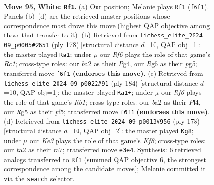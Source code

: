 \documentclass[11pt]{article}
\begin{document}
\clearpage

\begin{figure}[p]\centering
\begin{subfigure}{0.46\textwidth}\centering
\resizebox{\linewidth}{!}{%
\newchessgame
\chessboard[
  setfen={7r/3k4/1P3R2/6R1/8/4K3/b7/8 w - - 9 95},
  showmover=false,
  pgfstyle=straightmove, color=movearrow, markmove={f6-f1}
]}
\caption{}
\end{subfigure}\hfill
\begin{subfigure}{0.46\textwidth}\centering
\resizebox{\linewidth}{!}{%
\newchessgame
\chessboard[
  setfen={8/8/8/3k2p1/6P1/8/1r6/2R1K3 w - - 6 90},
  showmover=false,
  pgfstyle=straightmove, color=movearrow, markmove={c1-a1}
]}
\caption{}
\end{subfigure}
\\[4pt]
\begin{subfigure}{0.46\textwidth}\centering
\resizebox{\linewidth}{!}{%
\newchessgame
\chessboard[
  setfen={8/8/8/k4p2/5P2/8/7r/1R2K3 w - - 54 93},
  showmover=false,
  pgfstyle=straightmove, color=movearrow, markmove={b1-a1}
]}
\caption{}
\end{subfigure}\hfill
\begin{subfigure}{0.46\textwidth}\centering
\resizebox{\linewidth}{!}{%
\newchessgame
\chessboard[
  setfen={5K2/r7/3R3P/5k2/8/8/8/8 w - - 33 90},
  showmover=false,
  pgfstyle=straightmove, color=movearrow, markmove={f8-g8}
]}
\caption{}
\end{subfigure}
\caption{\textbf{Move 95, White: \texttt{Rf1}.} (a) Our position; Melanie plays \texttt{Rf1} (\texttt{f6f1}). Panels (b)--(d) are the retrieved master positions whose correspondence most drove this move (highest QAP objective among those that transfer to it). (b) Retrieved from \texttt{lichess\_elite\_2024-09\_p0005\#2651} (ply 178) [structural distance $d$=10, QAP obj=1]: the master played \texttt{Ra1}; under $\mu$ our \emph{Rf6} plays the role of that game's \emph{Rc1}; cross-type roles: our \emph{b}a2 as their \emph{P}g4, our \emph{R}g5 as their \emph{p}g5; transferred move \texttt{f6f1} \textbf{(endorses this move)}. (c) Retrieved from \texttt{lichess\_elite\_2024-09\_p0022\#91} (ply 184) [structural distance $d$=10, QAP obj=1]: the master played \texttt{Ra1+}; under $\mu$ our \emph{Rf6} plays the role of that game's \emph{Rb1}; cross-type roles: our \emph{b}a2 as their \emph{P}f4, our \emph{R}g5 as their \emph{p}f5; transferred move \texttt{f6f1} \textbf{(endorses this move)}. (d) Retrieved from \texttt{lichess\_elite\_2024-09\_p0013\#956} (ply 178) [structural distance $d$=10, QAP obj=2]: the master played \texttt{Kg8}; under $\mu$ our \emph{Ke3} plays the role of that game's \emph{Kf8}; cross-type roles: our \emph{b}a2 as their \emph{r}a7; transferred move \texttt{e3e4}. Synthesis: 6 retrieved analogs transferred to \texttt{Rf1} (summed QAP objective 6, the strongest correspondence among the candidate moves); Melanie committed it via the \texttt{search} selector.}
\label{fig:thought-m188}
\end{figure}
\end{document}
